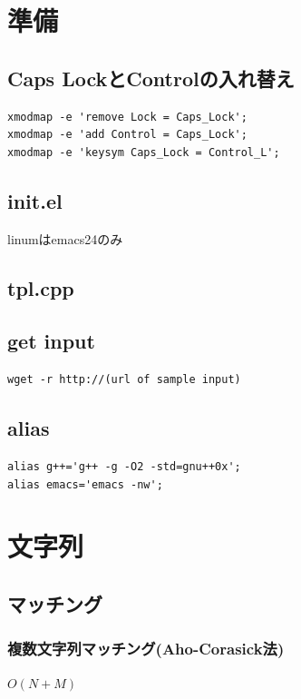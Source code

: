 \documentclass[9pt,twocolumn,a4paper,landscape]{extarticle}
\begin{document}
\tableofcontents
\newpage
%
%
\section{準備}
\subsection{Caps LockとControlの入れ替え}
\begin{lstlisting}
xmodmap -e 'remove Lock = Caps_Lock';
xmodmap -e 'add Control = Caps_Lock';
xmodmap -e 'keysym Caps_Lock = Control_L';
\end{lstlisting}

\subsection{init.el}
linumはemacs24のみ\par


\subsection{tpl.cpp}


\subsection{get input}
\begin{lstlisting}
wget -r http://(url of sample input)
\end{lstlisting}

\subsection{alias}
\begin{lstlisting}
alias g++='g++ -g -O2 -std=gnu++0x';
alias emacs='emacs -nw';
\end{lstlisting}

\section{文字列}
\subsection{マッチング}
\subsubsection{複数文字列マッチング(Aho-Corasick法)}
$O(N+M)$\par

\end{document}
